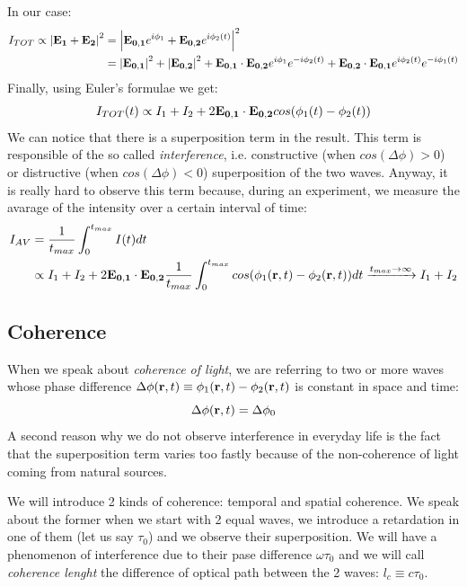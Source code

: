 \documentclass[11pt,a4paper]{article}
\begin{document}
In our case:
\begin{align*}
I_{TOT}\propto \abs{\vb{E_1}+\vb{E_2}}^2 &=\abs{\vb{E_{0,1}}e^{i\phi_1}+\vb{E_{0,2}}e^{i\phi_2(t)}}^2\\
&=\abs{\vb{E_{0,1}}}^2+\abs{\vb{E_{0,2}}}^2+\vb{E_{0,1}}\cdot \vb{E_{0,2}}e^{i\phi_1}e^{-i\phi_2(t)}+\vb{E_{0,2}}\cdot \vb{E_{0,1}}e^{i\phi_2(t)}e^{-i\phi_1(t)}
\end{align*}
Finally, using Euler's formulae we get:
\begin{equation}
I_{TOT}(t)\propto I_1+I_2+2\vb{E_{0,1}}\cdot \vb{E_{0,2}}cos(\phi_1(t)-\phi_2(t))
\end{equation}
We can notice that there is a superposition term in the result. This term is responsible of the so called \emph{interference}, i.e. constructive (when $cos(\Delta\phi)>0$) or distructive (when $cos(\Delta\phi)<0$) superposition of the two waves.  Anyway, it is really hard to observe this term because, during an experiment, we measure the avarage of the intensity over a certain interval of time:
\begin{align*}
I_{AV} &= \frac{1}{t_{max}}\int_0^{t_{max}}I(t)dt\\ &\propto I_1+I_2+ 2\vb{E_{0,1}}\cdot \vb{E_{0,2}} \frac{1}{t_{max}} \int_0^{t_{max}} cos(\phi_1(\vb{r},t)-\phi_2(\vb{r},t)) dt\xrightarrow{t_{max}\rightarrow \infty} I_1+I_2
\end{align*}


\subsection{Coherence}
When we speak about \emph{coherence of light}, we are referring to two or more waves whose phase difference $\Delta\phi(\vb{r},t)\equiv \phi_1(\vb{r},t)-\phi_2(\vb{r},t)$ is constant in space and time:
\begin{equation}
\Delta\phi(\vb{r},t)=\Delta\phi_0
\end{equation}
A second reason why we do not observe interference in everyday life is the fact that the superposition term varies too fastly because of the non-coherence of light coming from natural sources.

We will introduce 2 kinds of coherence: temporal and spatial coherence. We speak about the former when we start with 2 equal waves, we introduce a retardation in one of them (let us say $\tau_0$) and we observe their superposition. We will have a phenomenon of interference due to their pase difference $\omega \tau_0$ and we will call \emph{coherence lenght} the difference of optical path between the 2 waves: $l_c\equiv c\tau_0$.
\end{document}
